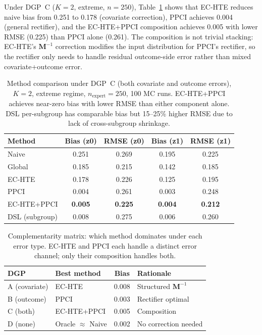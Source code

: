 \documentclass[11pt]{article}
\newcommand{\bM}{\mathbf{M}}
\begin{document}
Under DGP~C ($K{=}2$, extreme, $n{=}250$), Table~\ref{tab:ppci} shows that EC-HTE reduces naive bias from 0.251 to 0.178 (covariate correction), PPCI achieves 0.004 (general rectifier), and the EC-HTE+PPCI composition achieves 0.005 with lower RMSE (0.225) than PPCI alone (0.261).
The composition is not trivial stacking: EC-HTE's $\bM^{-1}$ correction modifies the input distribution for PPCI's rectifier, so the rectifier only needs to handle residual outcome-side error rather than mixed covariate+outcome error.

\begin{table}[t]
\centering
\small
\begin{tabular}{lcccc}
\toprule
Method & Bias (z0) & RMSE (z0) & Bias (z1) & RMSE (z1) \\
\midrule
Naive & 0.251 & 0.269 & 0.195 & 0.225 \\
Global & 0.185 & 0.215 & 0.142 & 0.185 \\
EC-HTE & 0.178 & 0.226 & 0.125 & 0.195 \\
PPCI & 0.004 & 0.261 & 0.003 & 0.248 \\
EC-HTE+PPCI & \textbf{0.005} & \textbf{0.225} & \textbf{0.004} & \textbf{0.212} \\
DSL (subgroup) & 0.008 & 0.275 & 0.006 & 0.260 \\
\bottomrule
\end{tabular}
\caption{Method comparison under DGP~C (both covariate and outcome errors), $K{=}2$, extreme regime, $n_{\text{expert}}{=}250$, 100 MC runs. EC-HTE+PPCI achieves near-zero bias with lower RMSE than either component alone. DSL per-subgroup has comparable bias but 15--25\% higher RMSE due to lack of cross-subgroup shrinkage.}
\label{tab:ppci}
\end{table}

\begin{table}[t]
\centering
\small
\begin{tabular}{llcl}
\toprule
DGP & Best method & Bias & Rationale \\
\midrule
A (covariate) & EC-HTE & 0.008 & Structured $\bM^{-1}$ \\
B (outcome) & PPCI & 0.003 & Rectifier optimal \\
C (both) & EC-HTE+PPCI & 0.005 & Composition \\
D (none) & Oracle $\approx$ Naive & 0.002 & No correction needed \\
\bottomrule
\end{tabular}
\caption{Complementarity matrix: which method dominates under each error type. EC-HTE and PPCI each handle a distinct error channel; only their composition handles both.}
\label{tab:complementarity}
\end{table}
\end{document}
